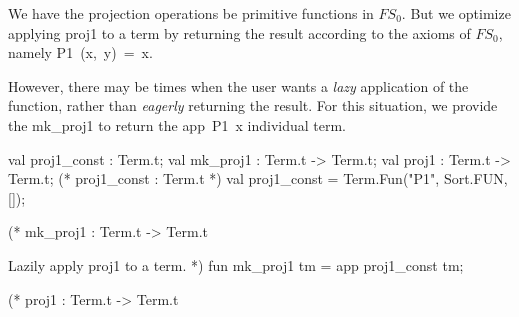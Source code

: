 \begin{node}
We have the projection operations be primitive functions in
$FS_{0}$. But we optimize applying {\Tt{}proj1\nwendquote} to a term by returning
the result according to the axioms of $FS_{0}$, namely {\Tt{}P1\ (x,\ y)\ =\ x\nwendquote}.

However, there may be times when the user wants a \emph{lazy}
application of the function, rather than \emph{eagerly} returning the
result. For this situation, we provide the {\Tt{}mk{\_}proj1\nwendquote} to return the
{\Tt{}app\ P1\ x\nwendquote} individual term.
\end{node}

\nwenddocs{}\plusendmoddef\nwstartdeflinemarkup{}\nwenddeflinemarkup
val proj1_const : Term.t;
val mk_proj1 : Term.t -> Term.t;
val proj1 : Term.t -> Term.t;
\nwendcode{}\nwdocspar
\nwenddocs{}\endmoddef\nwstartdeflinemarkup{}\nwenddeflinemarkup
(* proj1_const : Term.t *)
val proj1_const = Term.Fun("P1", Sort.FUN, []);

(* mk_proj1 : Term.t -> Term.t

Lazily apply proj1 to a term. *)
fun mk_proj1 tm = app proj1_const tm;

(* proj1 : Term.t -> Term.t

